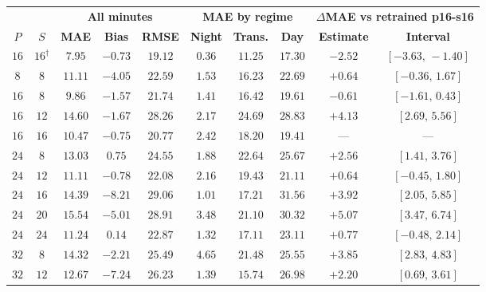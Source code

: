\begin{table}[!tbp]
    \centering
    \small
    \setlength{\tabcolsep}{4.5pt}
    \renewcommand{\arraystretch}{1.1}
    \begin{tabular}{@{}cccccccccc@{}}
        \toprule
        & & \multicolumn{3}{c}{\textbf{All minutes}} & \multicolumn{3}{c}{\textbf{MAE by regime}} & \multicolumn{2}{c}{\textbf{$\Delta$MAE vs retrained p16-s16}} \\
        \cmidrule(lr){3-5} \cmidrule(lr){6-8} \cmidrule(l){9-10}
        \textbf{$P$} & \textbf{$S$} & \textbf{MAE} & \textbf{Bias} & \textbf{RMSE} & \textbf{Night} & \textbf{Trans.} & \textbf{Day} & \textbf{Estimate} & \textbf{Interval} \\
        \midrule
        $16$ & $16^{\dagger}$ & $7.95$ & $-0.73$ & $19.12$ & $0.36$ & $11.25$ & $17.30$ & $-2.52$ & $[-3.63,\,-1.40]$ \\
        \midrule
        $8$ & $8$ & $11.11$ & $-4.05$ & $22.59$ & $1.53$ & $16.23$ & $22.69$ & $+0.64$ & $[-0.36,\,1.67]$ \\
        \midrule
        $16$ & $8$ & $9.86$ & $-1.57$ & $21.74$ & $1.41$ & $16.42$ & $19.61$ & $-0.61$ & $[-1.61,\,0.43]$ \\
        $16$ & $12$ & $14.60$ & $-1.67$ & $28.26$ & $2.17$ & $24.69$ & $28.83$ & $+4.13$ & $[2.69,\,5.56]$ \\
        $16$ & $16$ & $10.47$ & $-0.75$ & $20.77$ & $2.42$ & $18.20$ & $19.41$ & --- & --- \\
        \midrule
        $24$ & $8$ & $13.03$ & $0.75$ & $24.55$ & $1.88$ & $22.64$ & $25.67$ & $+2.56$ & $[1.41,\,3.76]$ \\
        $24$ & $12$ & $11.11$ & $-0.78$ & $22.08$ & $2.16$ & $19.43$ & $21.11$ & $+0.64$ & $[-0.45,\,1.80]$ \\
        $24$ & $16$ & $14.39$ & $-8.21$ & $29.06$ & $1.01$ & $17.21$ & $31.56$ & $+3.92$ & $[2.05,\,5.85]$ \\
        $24$ & $20$ & $15.54$ & $-5.01$ & $28.91$ & $3.48$ & $21.10$ & $30.32$ & $+5.07$ & $[3.47,\,6.74]$ \\
        $24$ & $24$ & $11.24$ & $0.14$ & $22.87$ & $1.32$ & $17.11$ & $23.11$ & $+0.77$ & $[-0.48,\,2.14]$ \\
        \midrule
        $32$ & $8$ & $14.32$ & $-2.21$ & $25.49$ & $4.65$ & $21.48$ & $25.55$ & $+3.85$ & $[2.83,\,4.83]$ \\
        $32$ & $12$ & $12.67$ & $-7.24$ & $26.23$ & $1.39$ & $15.74$ & $26.98$ & $+2.20$ & $[0.69,\,3.61]$ \\

\end{tabular}
\end{table}
